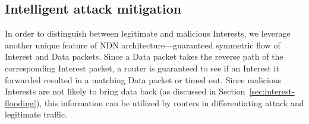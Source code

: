 \documentclass[10pt,conference]{IEEEtran}
\begin{document}



\subsection{Intelligent attack mitigation}
\label{sec:intelligent mitigating}


In order to distinguish between legitimate and malicious Interests, we leverage another unique feature of  NDN architecture---guaranteed symmetric flow of Interest and Data packets. Since a Data packet takes the reverse path of the corresponding Interest packet, a router is guaranteed to see if an Interest it forwarded resulted in a matching Data packet or timed out. %
Since malicious Interests are not likely to bring data back (as discussed in Section~\ref{sec:interest-flooding}), this information can be utilized by routers in differentiating attack and legitimate traffic.  %
\end{document}
